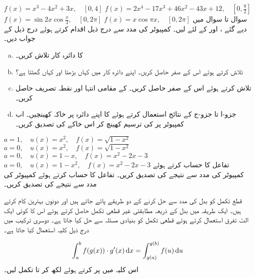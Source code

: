 $f(x)=x^3-4x^2+3x,\quad [0,4]$
$f(x)=2x^4-17x^3+46x^2-43x+12,\quad [0,\tfrac{9}{2}]$
$f(x)=\sin2x\cos\tfrac{x}{3},\quad [0,2\pi]$
$f(x)=x\cos \pi x,\quad [0,2\pi]$
سوال  تا سوال  میں دیے گئے ،  اور  کے لئے  لیں۔ کمپیوٹر کی مدد سے درج ذیل اقدام کرتے ہوئے درج ذیل کے جواب دیں۔
\begin{enumerate}[a.]
\item
{} کا دائرہ کار تلاش کریں۔
\item
{} تلاش کرتے ہوئے اس کے صفر حاصل کریں۔ اپنے دائرہ کار میں کہاں  بڑھتا اور کہاں گھٹتا ہے؟
\item
{} تلاش کرتے ہوئے اس کے صفر حاصل کریں۔ کے مقامی انتہا اور نقطہ تصریف حاصل کریں۔
\item
جزو-ا تا جزو-ج کے نتائج استعمال کرتے ہوئے  کا اپنے دائرہ پر خاکہ کھینچیں۔ اب کمپیوٹر پر  کی ترسیم کھینچ کر اس خاکے کی تصدیق کریں۔
\end{enumerate}
$a=1,\quad u(x)=x^2,\quad f(x)=\sqrt{1-x^2}$
$a=0,\quad u(x)=x^2,\quad f(x)=\sqrt{1-x^2}$
$a=0,\quad u(x)=1-x,\quad f(x)=x^2-2x-3$
$a=0,\quad u(x)=1-x^2,\quad f(x)=x^2-2x-3$
تفاعل  کا حساب کرتے ہوئے کمپیوٹر کی مدد سے نتیجے کی تصدیق کریں۔
تفاعل  کا حساب کرتے ہوئے کمپیوٹر کی مدد سے نتیجے کی تصدیق کریں۔

قطع تکمل کو بدل کی مدد سے حل کرنے کے دو طریقے پائے جاتے ہیں اور دونوں بہترین کام کرتے ہیں۔ ایک طریقہ میں بدل کے ذریعہ مطابقتی غیر قطعی تکمل حاصل کرتے ہوئے اس کا کوئی ایک الٹ تفرق استعمال کرتے ہوئے قطعی تکمل کو بنیادی مسئلہ سے حل کیا جاتا ہے۔ دوسری ترکیب میں درج ذیل کلیہ استعمال کیا جاتا ہے۔

\begin{align}\label{مساوات_تکمل_کلیہ_بدل}
\int_a^bf(g(x))\cdot g'(x)\dif x=\int_{g(a)}^{g(b)}f(u)\dif u
\end{align}
اس کلیہ میں  پر کرتے ہوئے  لکھ کر  تا  تکمل لیں۔

